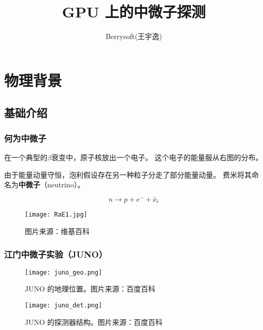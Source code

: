 \documentclass[aspectratio=169]{beamer}
\title{GPU 上的中微子探测}
\author{Berrysoft(王宇逸)}
\institute{清华大学工程物理系}
\begin{document}
\begin{frame}
    \titlepage
\end{frame}
\section{物理背景}
\subsection{基础介绍}
\begin{frame}
    \frametitle{何为中微子}

    \begin{multicols}{2}
        在一个典型的$\beta$衰变中，原子核放出一个电子。
        这个电子的能量服从右图的分布。

        由于能量动量守恒，泡利假设存在另一种粒子分走了部分能量动量。
        费米将其命名为\textbf{中微子}（neutrino）。

        \begin{equation*}
            n\to p+e^-+\bar{\nu}_e
        \end{equation*}
        \columnbreak
        \begin{figure}
            \centering
            \texttt{[image: RaE1.jpg]}
            \caption{图片来源：维基百科}
        \end{figure}
    \end{multicols}

\end{frame}

\begin{frame}[allowframebreaks]
    \frametitle{江门中微子实验（JUNO）}

    \begin{figure}
        \centering
        \texttt{[image: juno\_geo.png]}
        \caption{JUNO 的地理位置。图片来源：百度百科}
    \end{figure}

    \begin{figure}
        \centering
        \texttt{[image: juno\_det.png]}
        \caption{JUNO 的探测器结构。图片来源：百度百科}
    \end{figure}

\end{frame}
\end{document}
